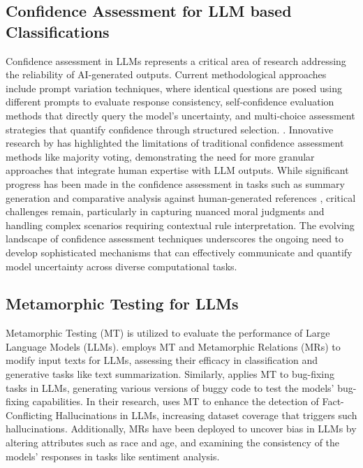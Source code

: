 \subsection{Confidence Assessment for LLM based Classifications}
Confidence assessment in LLMs represents a critical area of research addressing the reliability of AI-generated outputs. Current methodological approaches include prompt variation techniques, where identical questions are posed using different prompts to evaluate response consistency, self-confidence evaluation methods that directly query the model's uncertainty, and multi-choice assessment strategies that quantify confidence through structured selection. \cite{chen2023quantifying}. Innovative research by \cite{kim2024collaborative, kim2024collaborative} has highlighted the limitations of traditional confidence assessment methods like majority voting, demonstrating the need for more granular approaches that integrate human expertise with LLM outputs. While significant progress has been made in the confidence assessment in tasks such as summary generation and comparative analysis against human-generated references \cite{virk2024enhancing}, 
critical challenges remain, particularly in capturing nuanced moral judgments and handling complex scenarios requiring contextual rule interpretation. The evolving landscape of confidence assessment techniques underscores the ongoing need to develop sophisticated mechanisms that can effectively communicate and quantify model uncertainty across diverse computational tasks. \cite{when_to_make_exceptions_exploring_language_models_as_accounts_of_human__moral_judgment_2022}


\subsection{Metamorphic Testing for LLMs}
Metamorphic Testing (MT) is utilized to evaluate the performance of Large Language Models (LLMs). \cite{hyun2024metal} employs MT and Metamorphic Relations (MRs) to modify input texts for LLMs, assessing their efficacy in classification and generative tasks like text summarization. Similarly, \cite{xue2024exploring} applies MT to bug-fixing tasks in LLMs, generating various versions of buggy code to test the models' bug-fixing capabilities. In their research, \cite{li2024drowzee} uses MT to enhance the detection of Fact-Conflicting Hallucinations in LLMs, increasing dataset coverage that triggers such hallucinations. Additionally, MRs have been deployed to uncover bias in LLMs by altering attributes such as race and age, and examining the consistency of the models' responses in tasks like sentiment analysis.
